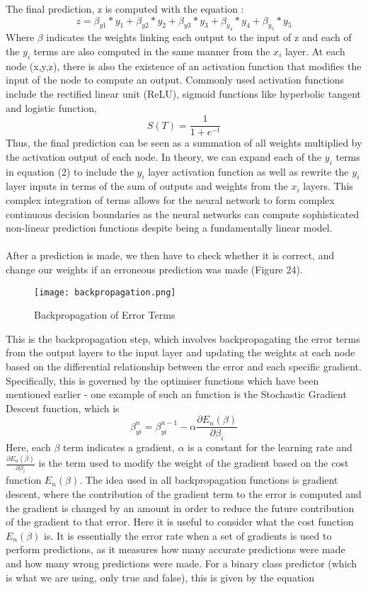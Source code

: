 \documentclass{article}
\begin{document}
The final prediction, z is computed with the equation :
\begin{equation}
z = \beta_{y1} * y_1 + \beta_{y2} * y_2 + \beta_{y3} * y_3 + \beta_{y_4} * y_4 + \beta_{y_5} * y_5
\end{equation}
Where $\beta$ indicates the weights linking each output to the input of z and each of the $y_i$ terms are also computed in the same manner from the $x_i$ layer. At each node (x,y,z), there is also the existence of an activation function that modifies the input of the node to compute an output. Commonly used activation functions include the rectified linear unit (ReLU), sigmoid functions like hyperbolic tangent and logistic function, 
\begin{equation}
S(T)=\frac{1}{1+e^{-t}}
\end{equation}
Thus, the final prediction can be seen as a summation of all weights multiplied by the activation output of each node. In theory, we can expand each of the $y_i$ terms in equation (2) to include the $y_i$ layer activation function as well as rewrite the $y_i$ layer inputs in terms of the sum of outputs and weights from the $x_i$ layers. This complex integration of terms allows for the neural network to form complex continuous decision boundaries as the neural networks can compute sophisticated non-linear prediction functions despite being a fundamentally linear model.\\\\ After a prediction is made, we then have to check whether it is correct, and change our weights if an erroneous prediction was made (Figure 24).
\begin{figure}[H]
\centering
\texttt{[image: backpropagation.png]}
\caption{Backpropagation of Error Terms}
\end{figure}
This is the backpropagation step, which involves backpropagating the error terms from the output layers to the input layer and updating the weights at each node based on the differential relationship between the error and each specific gradient. Specifically, this is governed by the optimiser functions which have been mentioned earlier - one example of such an function is the Stochastic Gradient Descent function, which is 
\begin{equation}
\beta^n_{yi} = \beta^{n-1}_{yi} - \alpha \frac{\partial{E_n}(\beta)}{\partial{\beta_i}}
\end{equation}
Here, each $\beta$ term indicates a gradient, $\alpha$ is a constant for the learning rate and $\frac{\partial{E_n}(\beta)}{\partial{\beta_i}}$ is the term used to modify the weight of the gradient based on the cost function ${E_n}(\beta)$. The idea used in all backpropagation functions is gradient descent, where the contribution of the gradient term to the error is computed and the gradient is changed by an amount in order to reduce the future contribution of the gradient to that error. Here it is useful to consider what the cost function ${E_n}(\beta)$ is. It is essentially the error rate when a set of gradients is used to perform predictions, as it measures how many accurate predictions were made and how many wrong predictions were made. For a binary class predictor (which is what we are using, only true and false), this is given by the equation
\end{document}
